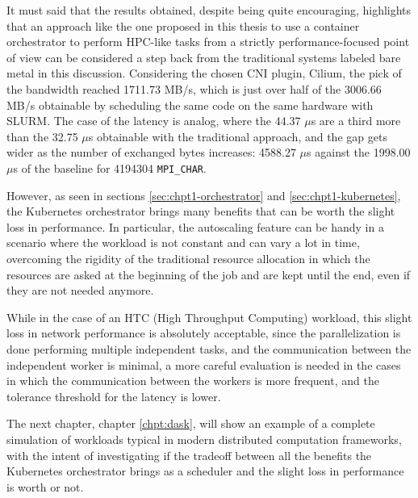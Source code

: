 It must said that the results obtained, despite being quite encouraging,
highlights that an approach like the one proposed in this thesis to use a
container orchestrator to perform HPC-like tasks from a strictly
performance-focused point of view can be considered a step back from the
traditional systems labeled bare metal in this discussion.
Considering the chosen CNI plugin, Cilium, the pick of the bandwidth reached
1711.73 MB/s, which is just over half of the 3006.66 MB/s obtainable by
scheduling the same code on the same hardware with SLURM.
The case of the latency is analog, where the 44.37 $\mu$s are a third more than
the 32.75 $\mu$s obtainable with the traditional approach, and the gap gets
wider as the number of exchanged bytes increases: 4588.27 $\mu$s against the
1998.00 $\mu$s of the baseline for 4194304 \texttt{MPI\_CHAR}.

However, as seen in sections \ref{sec:chpt1-orchestrator} and
\ref{sec:chpt1-kubernetes}, the Kubernetes orchestrator brings many benefits
that can be worth the slight loss in performance.
In particular, the autoscaling feature can be handy in a scenario where the
workload is not constant and can vary a lot in time, overcoming the rigidity of
the traditional resource allocation in which the resources are asked at the
beginning of the job and are kept until the end, even if they are not needed
anymore.

While in the case of an HTC (High Throughput Computing) workload, this slight
loss in network performance is absolutely acceptable, since the parallelization
is done performing multiple independent tasks, and the communication between the
independent worker is minimal, a more careful evaluation is needed in the cases
in which the communication between the workers is more frequent, and the
tolerance threshold for the latency is lower.

The next chapter, chapter \ref{chpt:dask}, will show an example of a complete
simulation of workloads typical in modern distributed computation frameworks,
with the intent of investigating if the tradeoff between all the benefits the
Kubernetes orchestrator brings as a scheduler and the slight loss in performance
is worth or not.

